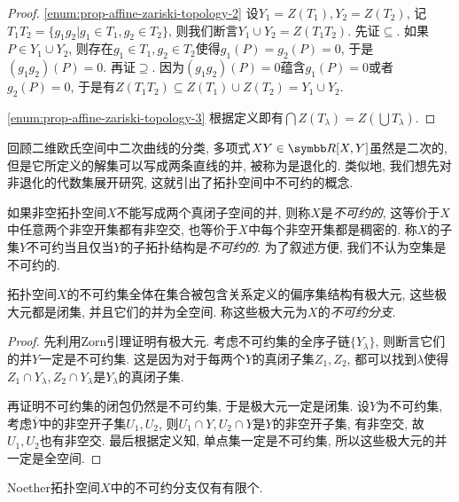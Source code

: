 \begin{proof}
  \ref{enum:prop-affine-zariski-topology-2} 设$Y_1=Z(T_1), Y_2 = Z(T_2)$, 记$T_1T_2=\{g_1g_2\vert g_1\in T_1, g_2\in T_2\}$, 则我们断言$Y_1\cup Y_2 = Z(T_1T_2)$. 先证$\subseteq$. 如果$P\in Y_1\cup Y_2$, 则存在$g_1\in T_1, g_2\in T_2$使得$g_1(P)=g_2(P)=0$, 于是$(g_1g_2)(P)=0$. 再证$\supseteq$. 因为$(g_1g_2)(P)=0$蕴含$g_1(P)=0$或者$g_2(P)=0$, 于是有$Z(T_1T_2)\subseteq Z(T_1)\cup Z(T_2)=Y_1\cup Y_2$.

  \ref{enum:prop-affine-zariski-topology-3} 根据定义即有$\bigcap Z(T_\lambda)=Z(\bigcup T_\lambda)$.
\end{proof}

回顾二维欧氏空间中二次曲线的分类, 多项式$XY\in \RR[X, Y]$虽然是二次的, 但是它所定义的解集可以写成两条直线的并, 被称为是退化的. 类似地, 我们想先对非退化的代数集展开研究, 这就引出了拓扑空间中不可约的概念.

如果非空拓扑空间$X$不能写成两个真闭子空间的并, 则称$X$是\emph{不可约的}, 这等价于$X$中任意两个非空开集都有非空交, 也等价于$X$中每个非空开集都是稠密的\parencite[13, Exercise 19]{atiyah_introduction_1969}. 称$X$的子集$Y$不可约当且仅当$Y$的子拓扑结构是\emph{不可约的}. 为了叙述方便, 我们不认为空集是不可约的.

\begin{proposition}
  拓扑空间$X$的不可约集全体在集合被包含关系定义的偏序集结构有极大元, 这些极大元都是闭集, 并且它们的并为全空间. 称这些极大元为$X$的\emph{不可约分支}.
\end{proposition}

\begin{proof}
  先利用Zorn引理证明有极大元. 考虑不可约集的全序子链$\{Y_\lambda\}$, 则断言它们的并$Y$一定是不可约集. 这是因为对于每两个$Y$的真闭子集$Z_1, Z_2$, 都可以找到$\lambda$使得$Z_1\cap Y_\lambda, Z_2\cap Y_\lambda$是$Y_\lambda$的真闭子集.

  再证明不可约集的闭包仍然是不可约集, 于是极大元一定是闭集. 设$Y$为不可约集, 考虑$\overline{Y}$中的非空开子集$U_1, U_2$, 则$U_1\cap Y, U_2\cap Y$是$Y$的非空开子集, 有非空交, 故$U_1, U_2$也有非空交. 最后根据定义知, 单点集一定是不可约集, 所以这些极大元的并一定是全空间.
\end{proof}

\begin{proposition}\label{prop:noetherirreduciblecomponent}
  Noether拓扑空间$X$中的不可约分支仅有有限个.
\end{proposition}


